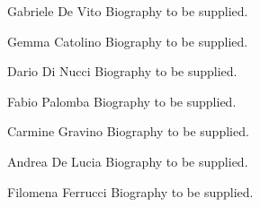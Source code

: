 \begin{IEEEbiographynophoto}{Gabriele De Vito}
Biography to be supplied.
\end{IEEEbiographynophoto}
\begin{IEEEbiographynophoto}{Gemma Catolino}
Biography to be supplied.
\end{IEEEbiographynophoto}
\begin{IEEEbiographynophoto}{Dario Di Nucci}
Biography to be supplied.
\end{IEEEbiographynophoto}
\begin{IEEEbiographynophoto}{Fabio Palomba}
Biography to be supplied.
\end{IEEEbiographynophoto}
\begin{IEEEbiographynophoto}{Carmine Gravino}
Biography to be supplied.
\end{IEEEbiographynophoto}
\begin{IEEEbiographynophoto}{Andrea De Lucia}
Biography to be supplied.
\end{IEEEbiographynophoto}
\begin{IEEEbiographynophoto}{Filomena Ferrucci}
Biography to be supplied.
\end{IEEEbiographynophoto}
